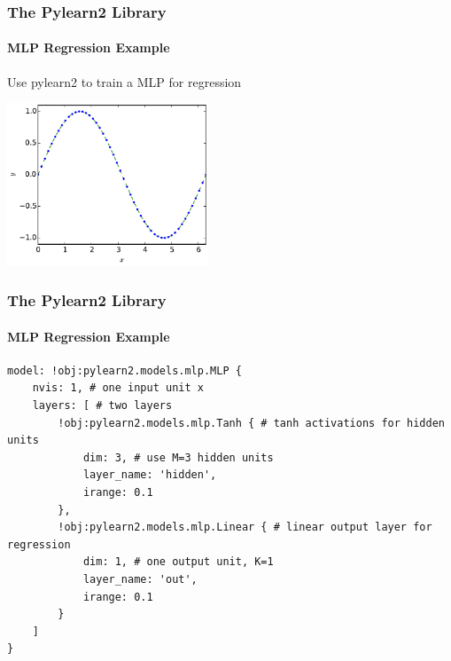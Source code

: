 \documentclass[xetex,professionalfont]{beamer}
\begin{document}

\begin{frame}
\frametitle{The Pylearn2 Library}
\framesubtitle{MLP Regression Example}

Use pylearn2 to train a MLP for regression

\medskip
\begin{center}
	\includegraphics[width=6cm]{figures/mlp-input.pdf} %
\end{center}

\end{frame}


\begin{frame}[fragile]
\frametitle{The Pylearn2 Library}
\framesubtitle{MLP Regression Example}


\begin{verbatim}
model: !obj:pylearn2.models.mlp.MLP {
    nvis: 1, # one input unit x
    layers: [ # two layers
        !obj:pylearn2.models.mlp.Tanh { # tanh activations for hidden units
            dim: 3, # use M=3 hidden units
            layer_name: 'hidden',
            irange: 0.1
        },
        !obj:pylearn2.models.mlp.Linear { # linear output layer for regression
            dim: 1, # one output unit, K=1 
            layer_name: 'out',
            irange: 0.1
        }
    ]
}
\end{verbatim}

\end{frame}


\end{document}
